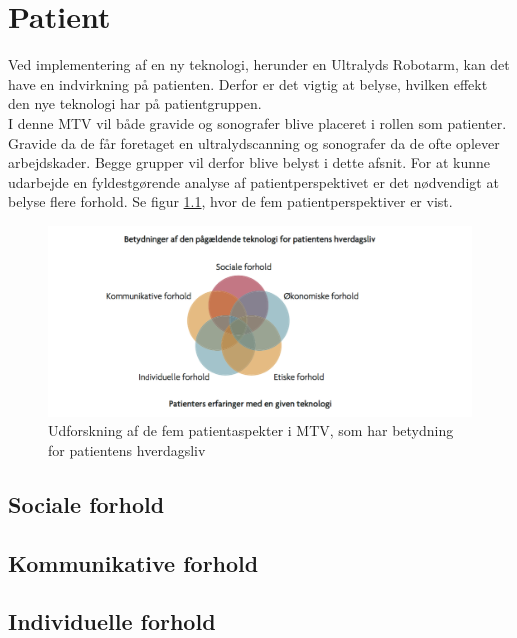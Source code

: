 \chapter{Patient}
Ved implementering af en ny teknologi, herunder en Ultralyds Robotarm, kan det have en indvirkning på patienten. Derfor er det vigtig at belyse, hvilken effekt den nye teknologi har på patientgruppen. \\
I denne MTV vil både gravide og sonografer blive placeret i rollen som patienter. Gravide da de får foretaget en ultralydscanning og sonografer da de ofte oplever arbejdskader. Begge grupper vil derfor blive belyst i dette afsnit.  
\newline
For at kunne udarbejde en fyldestgørende analyse af patientperspektivet er det nødvendigt at belyse flere forhold. Se figur \ref{patientMTV}, hvor de fem patientperspektiver er vist. 
\begin{figure}[h!]\centering
	\includegraphics[width = 1.0\textwidth]{Figurer/PatientaspekterMTV}
	\caption{Udforskning af de fem patientaspekter i MTV, som har betydning for patientens hverdagsliv}
	\label{patientMTV}
\end{figure}

\section{Sociale forhold }
\section{Kommunikative forhold}

\section{Individuelle forhold}
